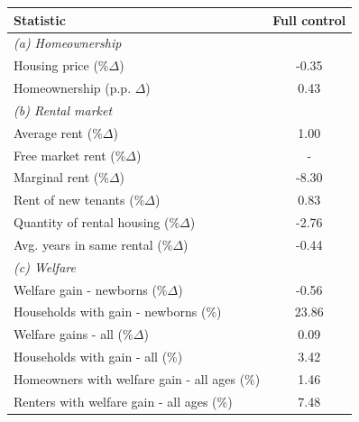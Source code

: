 \begin{table}[p]
\tiny
\renewcommand{\arraystretch}{1.2}
\renewcommand{\cellalign}{bc}
\begin{center}
\begin{tabular}{lc}
\toprule
Statistic & Full control\\
\midrule
\multicolumn{2}{l}{\textit{(a) Homeownership}}\\
Housing price (\%$\Delta$) & -0.35 \\
Homeownership (p.p. $\Delta$) & 0.43  \\
\multicolumn{2}{l}{\textit{(b) Rental market}}\\
Average rent (\%$\Delta$) & 1.00 \\
Free market rent (\%$\Delta$) & - \\
Marginal rent (\%$\Delta$) & -8.30 \\
Rent of new tenants (\%$\Delta$) & 0.83 \\
Quantity of rental housing (\%$\Delta$) & -2.76\\
Avg. years in same rental (\%$\Delta$) & -0.44 \\
\multicolumn{2}{l}{\textit{(c) Welfare}}\\
Welfare gain - newborns (\%$\Delta$) & -0.56  \\
Households with gain - newborns (\%) & 23.86  \\
Welfare gains - all (\%$\Delta$) & 0.09\\
Households with gain - all (\%) & 3.42 \\
\quad Homeowners with welfare gain - all ages (\%) & 1.46 \\
\quad Renters with welfare gain - all ages (\%) & 7.48 \\
\bottomrule
\end{tabular}
\end{center}
\normalsize
\end{table}
